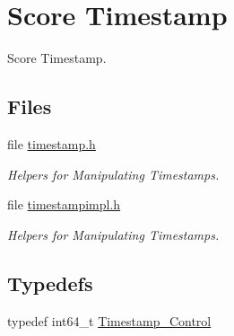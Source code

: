 \hypertarget{group__SuperCoreTimeStamp}{}\section{Score Timestamp}
\label{group__SuperCoreTimeStamp}


Score Timestamp.  


\subsection*{Files}
\begin{DoxyCompactItemize}
\item 
file \mbox{\hyperlink{timestamp_8h}{timestamp.\+h}}
\begin{DoxyCompactList}\small\item\em Helpers for Manipulating Timestamps. \end{DoxyCompactList}\item 
file \mbox{\hyperlink{timestampimpl_8h}{timestampimpl.\+h}}
\begin{DoxyCompactList}\small\item\em Helpers for Manipulating Timestamps. \end{DoxyCompactList}\end{DoxyCompactItemize}
\subsection*{Typedefs}
\begin{DoxyCompactItemize}
\item 
typedef int64\+\_\+t \mbox{\hyperlink{group__SuperCoreTimeStamp_ga8508036506d5211c98844c88045e2410}{Timestamp\+\_\+\+Control}}
\end{DoxyCompactItemize}
